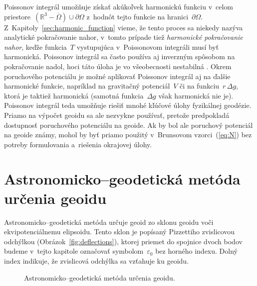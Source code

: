 \documentclass[a4paper, 12pt]{book}
\begin{document}
Poissonov integrál umožňuje získať akúkoľvek harmonickú funkciu v~celom 
priestore~$\left( \mathbb{R}^3 - \overline\Omega \right) \cup \partial\Omega$ 
z~hodnôt tejto funkcie na hranici~$\partial\Omega$.  
Z~Kapitoly~\ref{sec:harmonic_function} vieme, že tento proces sa niekedy nazýva 
analytické pokračovanie nahor, v~tomto prípade tiež \emph{harmonické 
pokračovanie nahor}, keďže funkcia~$T$ vystupujúca v~Poissonovom integráli musí 
byť harmonická.  Poissonov integrál sa často používa aj inverzným spôsobom na 
pokračovanie nadol, hoci táto úloha je vo všeobecnosti nestabilná 
\parencite{SansoGeodeticBoundaryValueProblem}.  Okrem poruchového potenciálu je 
možné aplikovať Poissonov integrál aj na ďalšie harmonické funkcie, napríklad 
na gravitačný potenciál~$V$ či na funkciu~$r \, \Delta g$, ktorá je taktiež 
harmonická (samotná funkcia~$\Delta g$ však harmonická nie je).  Poissonov 
integrál teda umožňuje riešiť mnohé kľúčové úlohy fyzikálnej geodézie.  Priamo 
na výpočet geoidu sa ale nezvykne používať, pretože predpokladá dostupnosť 
poruchového potenciálu na geoide.  Ak by bol ale poruchový potenciál na geoide 
známy, mohol by byť priamo použitý v~Brunsovom vzorci~(\ref{eq:N}) bez potreby 
formulovania a~riešenia okrajovej úlohy.




\section{Astronomicko--geodetická metóda určenia geoidu}
\label{sec:geoid_astrogeodetic}

Astronomicko--geodetická metóda určuje geoid zo sklonu geoidu voči 
ekvipotenciálnemu elipsoidu.  Tento sklon je popísaný Pizzettiho zvislicovou 
odchýlkou (Obrázok~\ref{fig:deflections}), ktorej priemet do spojnice dvoch 
bodov budeme v~tejto kapitole označovať symbolom~$\varepsilon_0$ bez horného 
indexu.  Dolný index indikuje, že zvislicová odchýlka sa vzťahuje ku geoidu.

\begin{figure}[bt]
\centering

\caption{Astronomicko--geodetická metóda určenia geoidu.}
\label{fig:astrogeodetic_method}
\end{figure}
\end{document}

